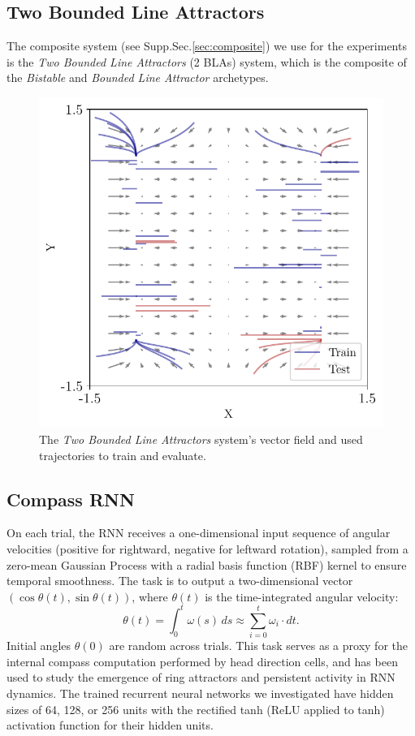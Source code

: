 \documentclass{article}
\theoremstyle{definition} \newtheorem{definition}{Definition}  \newtheorem{example}{Example}
\theoremstyle{remark} \newtheorem{remark}{Remark}
\newcounter{ct}
\begin{document}
\subsection{Two Bounded Line Attractors}
The composite system (see Supp.Sec.\ref{sec:composite}) we use for the experiments is the \emph{Two Bounded Line Attractors} (2 BLAs) system, which is the composite of the \emph{Bistable} and \emph{Bounded Line Attractor} archetypes.
\begin{figure}[htbp]
    \centering
    \includegraphics[width=.5\linewidth]{twoblas_vf_trajs}
    \caption{The \emph{Two Bounded Line Attractors} system's vector field and used trajectories to train and evaluate.
     }
    \label{fig:twoblas_vf_trajs}
\end{figure}


\subsection{Compass RNN}
On each trial, the RNN receives a one-dimensional input sequence of angular velocities (positive for rightward, negative for leftward rotation), sampled from a zero-mean Gaussian Process with a radial basis function (RBF) kernel to ensure temporal smoothness. The task is to output a two-dimensional vector \( (\cos \theta(t), \sin \theta(t)) \), where \( \theta(t) \) is the time-integrated angular velocity:
\[
\theta(t) = \int_0^t \omega(s) \, ds \approx \sum_{i=0}^{t} \omega_i \cdot dt.
\]
Initial angles \( \theta(0) \) are random across trials. 
This task serves as a proxy for the internal compass computation performed by head direction cells, and has been used to study the emergence of ring attractors and persistent activity in RNN dynamics.
%
The trained recurrent neural networks we investigated have hidden sizes of 64, 128, or 256 units with the rectified tanh (ReLU applied to tanh) activation function for their hidden units. 
\end{document}
